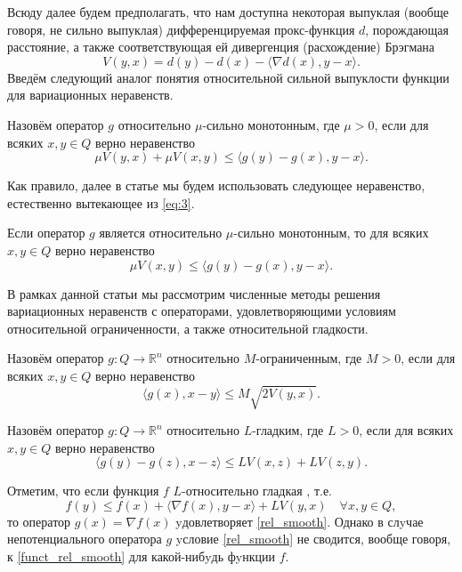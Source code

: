Всюду далее будем предполагать, что нам доступна некоторая выпуклая (вообще говоря, не сильно выпуклая) дифференцируемая прокс-функция $d$, порождающая расстояние, а также соответствующая ей дивергенция (расхождение) Брэгмана \cite{Bauschke}
$$
V(y, x) = d(y) - d(x) - \langle \nabla d(x), y - x \rangle.
$$
Введём следующий аналог понятия относительной сильной выпуклости функции \cite{Lu_Nesterov_2018} для вариационных неравенств.
\begin{definition}\label{DefRelStrongMonot}
Назовём оператор $g$ относительно $\mu$-сильно монотонным, где $\mu >0$, если для всяких $x, y \in Q$ верно неравенство
	\begin{equation}\label{eq:3}
	 	\mu V(y, x) + \mu V(x, y) \leq \langle g(y) - g(x), y - x \rangle.
	 \end{equation}
\end{definition}
Как правило, далее в статье мы будем использовать следующее неравенство, естественно вытекающее из \eqref{eq:3}.
\begin{remark}
Если оператор $g$ является  относительно $\mu$-сильно монотонным, то для всяких $x, y \in Q$ верно неравенство
	\begin{equation}\label{cr:4}
	 	\mu V(x, y) \leq \langle g(y) - g(x), y - x \rangle.
	 \end{equation}
\end{remark}
В рамках данной статьи мы рассмотрим численные методы решения вариационных неравенств с операторами, удовлетворяющими условиям относительной ограниченности, а также относительной гладкости.
\begin{definition}\label{DefRelBound}\cite{Main}
Назовём оператор $g: Q \longrightarrow \mathbb{R}^n$ относительно $M$-огранич\-енным, где $M >0$, если для всяких $x, y \in Q$ верно неравенство
	\begin{equation}\label{rel_bound}
	 	\langle g(x), x - y \rangle \leq M\sqrt{2V(y,x)}.
	 \end{equation}
\end{definition}
\begin{definition}\cite{Inex}
Назовём оператор $g: Q \longrightarrow \mathbb{R}^n$ относительно $L$-гладким, где $L > 0$, если для всяких $x, y \in Q$ верно неравенство
\begin{equation}\label{rel_smooth}
    \langle g(y)-g(z),x-z\rangle \leq LV(x,z) + LV(z,y).
    \end{equation}
\end{definition}

Отметим, что если функция $f$ $L$-относительно гладкая \cite{Bauschke}, т.е.
\begin{equation}\label{funct_rel_smooth}
f(y) \leq f(x) + \langle \nabla f(x), y - x\rangle + LV(y, x) \quad \forall x, y \in Q,
\end{equation}
то оператор $g(x) = \nabla f(x)$ yдовлетворяет \eqref{rel_smooth}. Однако в слyчае непотенциального оператора $g$ yсловие \eqref{rel_smooth} не сводится, вообще говоря, к \eqref{funct_rel_smooth} для какой-нибyдь фyнкции $f$.


